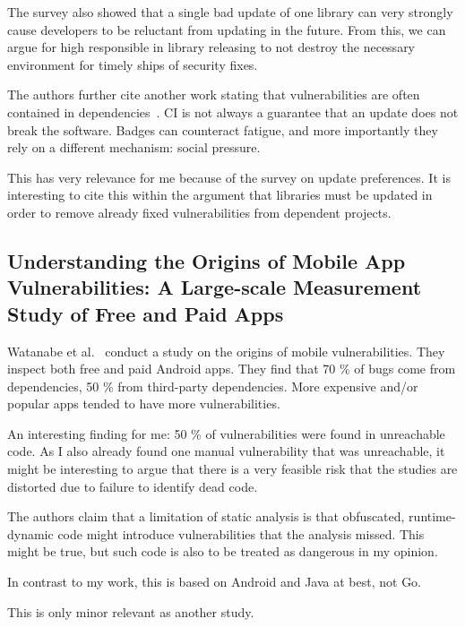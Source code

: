 The survey also showed that a single bad update of one library can very strongly cause developers to be reluctant from
updating in the future.
From this, we can argue for high responsible in library releasing to not destroy the necessary environment for timely
ships of security fixes.

The authors further cite another work stating that vulnerabilities are often contained in dependencies~\cite{xia2014}.
CI is not always a guarantee that an update does not break the software.
Badges can counteract fatigue, and more importantly they rely on a different mechanism: social pressure.

This has very relevance for me because of the survey on update preferences.
It is interesting to cite this within the argument that libraries must be updated in order to remove already fixed
vulnerabilities from dependent projects.



\subsection{Understanding the Origins of Mobile App Vulnerabilities: A Large-scale Measurement Study of Free and Paid Apps}
\label{subsec:understanding-the-origins-of-mobile-app-vulnerabilities:-a-large-scale-measurement-study-of-free-and-paid-apps}

Watanabe et al.~\cite{watanabe2017} conduct a study on the origins of mobile vulnerabilities.
They inspect both free and paid Android apps.
They find that 70 \% of bugs come from dependencies, 50 \% from third-party dependencies.
More expensive and/or popular apps tended to have more vulnerabilities.

An interesting finding for me: 50 \% of vulnerabilities were found in unreachable code.
As I also already found one manual vulnerability that was unreachable, it might be interesting to argue that there is a
very feasible risk that the studies are distorted due to failure to identify dead code.

The authors claim that a limitation of static analysis is that obfuscated, runtime-dynamic code might introduce
vulnerabilities that the analysis missed.
This might be true, but such code is also to be treated as dangerous in my opinion.

In contrast to my work, this is based on Android and Java at best, not Go.

This is only minor relevant as another study.
